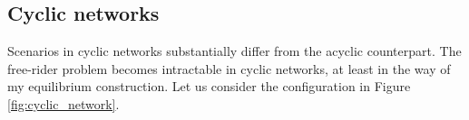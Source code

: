 \documentclass[12pt,letter]{article}
\theoremstyle{definition}
\theoremstyle{remark}
\theoremstyle{claim}
\begin{document}
%
%
%
%
%
%
%
%
\subsection{Cyclic networks}
\label{sec:cyclic}


Scenarios in cyclic networks substantially differ from the acyclic counterpart. The free-rider problem becomes intractable in cyclic networks, at least in the way of my equilibrium construction. Let us consider the configuration in Figure \ref{fig:cyclic_network}.
\end{document}

